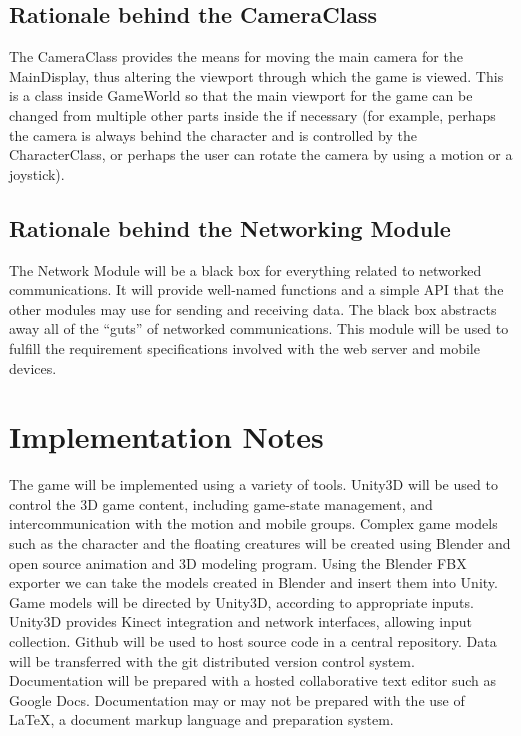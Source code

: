 \documentclass[10pt,letterpaper,oneside,english]{article}
\begin{document}
\subsection{Rationale behind the CameraClass}

The CameraClass provides the means for moving the main camera for the MainDisplay, thus altering the viewport through which the game is viewed. This is a class inside GameWorld so that the main viewport for the game can be changed from multiple other parts inside the if necessary (for example, perhaps the camera is always behind the character and is controlled by the CharacterClass, or perhaps the user can rotate the camera by using a motion or a joystick).

\subsection{Rationale behind the Networking Module}

The Network Module will be a black box for everything related to networked communications. It will provide well-named functions and a simple API that the other modules may use for sending and receiving data. The black box abstracts away all of the “guts” of networked communications. This module will be used to fulfill the requirement specifications involved with the web server and mobile devices.

\section{Implementation Notes}
The game will be implemented using a variety of tools. 
Unity3D will be used to control the 3D game content, including game-state management, and intercommunication with the motion and mobile groups. Complex game models such as the character and the floating creatures will be created using Blender and open source animation and 3D modeling program. Using the Blender FBX exporter we can take the models created in Blender and insert them into Unity. Game models will be directed by Unity3D, according to appropriate inputs. Unity3D provides Kinect integration and network interfaces, allowing input collection.
Github will be used to host source code in a central repository. Data will be transferred with the git distributed version control system.
Documentation will be prepared with a hosted collaborative text editor such as Google Docs. Documentation may or may not be prepared with the use of LaTeX, a document markup language and preparation system.
\end{document}
